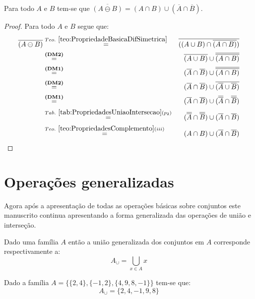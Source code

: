 \begin{theorem}
	Para todo $A$ e $B$ tem-se que $\overline{(A \ominus B)} = (A \cap B) \cup (\overline{A} \cap \overline{B})$.
\end{theorem}

\begin{proof}
	Para todo $A$ e $B$ segue que:
	\begin{eqnarray*}
		\overline{(A \ominus B)} & \stackrel{Teo. \ \ref{teo:PropriedadeBasicaDifSimetrica}}{=} & \overline{((A \cup B) \cap \overline{(A \cap B)})}\\
		& \stackrel{\textbf{(DM2)}}{=}& \overline{(A \cup B)} \cup \overline{\overline{(A \cap B)}}\\
		& \stackrel{\textbf{(DM1)}}{=}& (\overline{A} \cap \overline{B}) \cup \overline{\overline{(A \cap B)}}\\
		& \stackrel{\textbf{(DM2)}}{=}& (\overline{A} \cap \overline{B}) \cup \overline{(\overline{A} \cup \overline{B})}\\
		& \stackrel{\textbf{(DM1)}}{=}& (\overline{A} \cap \overline{B}) \cup (\overline{\overline{A}} \cap \overline{\overline{B}})\\
		& \stackrel{Tab. \ \ref{tab:PropriedadesUniaoIntersecao}(p_2)}{=}& (\overline{\overline{A}} \cap \overline{\overline{B}}) \cup (\overline{A} \cap \overline{B})\\
		& \stackrel{Teo. \ \ref{teo:PropriedadesComplemento}(iii)}{=}& (A \cap B) \cup (\overline{A} \cap \overline{B})
	\end{eqnarray*}
\end{proof}

\section{Operações generalizadas}\label{sec:OperacaoGeneralizada}

Agora após a apresentação de todas as operações básicas sobre conjuntos este manuscrito continua apresentando a forma generalizada das operações de união e interseção. 

\begin{definition}\label{def:UniaoGeneralizadas}
	Dado uma família $A$ então a união generalizada dos conjuntos em $A$ corresponde respectivamente a:
	$$A_\cup = \bigcup_{x \in A} x$$
\end{definition}

\begin{example}
	Dado a família $A = \{\{2, 4\}, \{-1, 2\}, \{4, 9, 8, -1\}\}$ tem-se que:
	$$A_\cup = \{2, 4, -1, 9, 8\}$$
\end{example}

